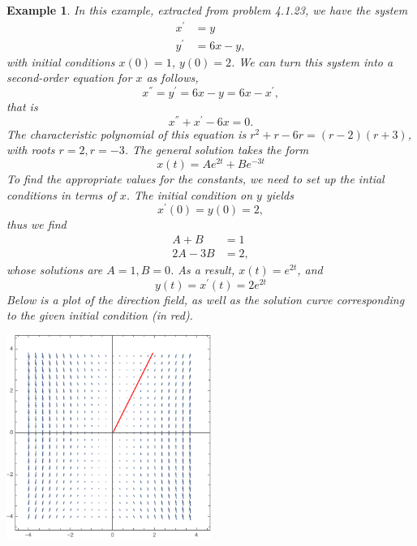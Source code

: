 \documentclass[11pt]{amsart}
\newtheorem{example}{Example}
\numberwithin{equation}{section}
\begin{document}
\begin{example}
In this example, extracted from problem 4.1.23, we have the system
\begin{align*}
x^{'} & = y \\
y^{'} & = 6x-y,
\end{align*}
with initial conditions $x(0)=1$, $y(0)=2$. We can turn this system into a second-order equation for $x$ as follows, 
\begin{equation*}
x^{''} = y^{'} = 6x-y = 6x-x^{'}, 
\end{equation*}
that is
\begin{equation*}
x^{''}+x^{'}-6x=0.
\end{equation*}
The characteristic polynomial of this equation is $r^2+r-6r=(r-2)(r+3)$, with roots $r=2, r=-3$.  The general solution takes the form
\begin{equation*}
x(t)=Ae^{2t}+Be^{-3t}
\end{equation*}
To find the appropriate values for the constants, we need to set up the intial conditions in terms of $x$. The initial condition on $y$ yields 
\begin{equation*}
x^{'}(0) = y(0) = 2,
\end{equation*}
thus we find
\begin{align*}
A+B & = 1\\
2A-3B & = 2,
\end{align*}
whose solutions are $A=1, B=0$. As a result, $x(t)=e^{2t}$, and 
\begin{equation*}
y(t) = x^{'}(t) = 2e^{2t}
\end{equation*}
Below is a plot of the direction field, as well as the solution curve corresponding to the given initial condition (in red).
\begin{center}
\includegraphics[width=0.5\textwidth]{p5.png} 
\end{center}
\end{example}
\end{document}
